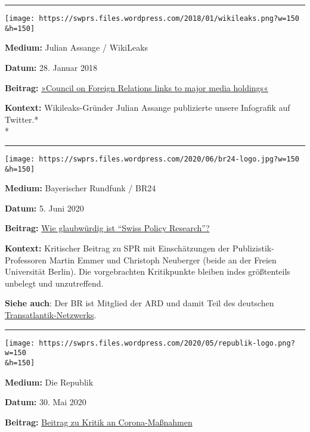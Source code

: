 \begin{center}\rule{0.5\linewidth}{\linethickness}\end{center}

\texttt{[image: https://swprs.files.wordpress.com/2018/01/wikileaks.png?w=150\\\&h=150]}

\textbf{Medium:} Julian Assange / WikiLeaks

\textbf{Datum:} 28. Januar 2018

\textbf{Beitrag:}
\href{https://swprs.files.wordpress.com/2018/01/assange-tweet.png}{»Council
on Foreign Relations links to major media holdings«}

\textbf{Kontext:} Wikileaks-Gründer Julian Assange publizierte unsere
Infografik auf Twitter.*\\
*

\begin{center}\rule{0.5\linewidth}{\linethickness}\end{center}

\texttt{[image: https://swprs.files.wordpress.com/2020/06/br24-logo.jpg?w=150\\\&h=150]}

\textbf{Medium:} Bayerischer Rundfunk / BR24

\textbf{Datum:} 5. Juni 2020

\textbf{Beitrag:}
\href{https://www.br.de/nachrichten/deutschland-welt/faktenfuchs-wie-glaubwuerdig-ist-swiss-policy-research,S128XLH}{Wie
glaubwürdig ist ``Swiss Policy Research''?}

\textbf{Kontext:} Kritischer Beitrag zu SPR mit Einschätzungen der
Publizistik-Professoren Martin Emmer und Christoph Neuberger (beide an
der Freien Universität Berlin). Die vorgebrachten Kritikpunkte bleiben
indes größtenteils unbelegt und unzutreffend.

\textbf{Siehe auch}: Der BR ist Mitglied der ARD und damit Teil des
deutschen
\href{https://swprs.org/netzwerk-medien-deutschland/}{Transatlantik-Netzwerks}.

\begin{center}\rule{0.5\linewidth}{\linethickness}\end{center}

\texttt{[image: https://swprs.files.wordpress.com/2020/05/republik-logo.png?w=150\\\&h=150]}

\textbf{Medium:} Die Republik

\textbf{Datum:} 30. Mai 2020

\textbf{Beitrag:}
\href{https://www.republik.ch/2020/05/30/der-malwiederstand-der-corona-rebellen}{Beitrag
zu Kritik an Corona-Maßnahmen}

